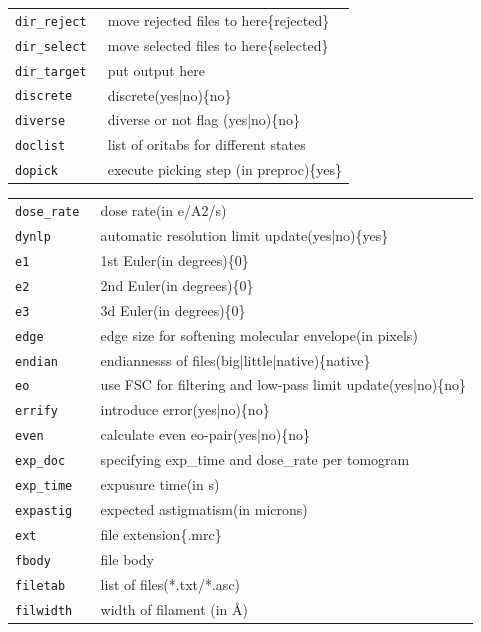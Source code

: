 \documentclass[a4paper,11pt]{article}
\begin{document}
\begin{tabular}{ll}
\texttt{dir\_reject      }&{ move rejected files to here\{rejected\}}\\
\texttt{dir\_select      }&{ move selected files to here\{selected\}}\\
\texttt{dir\_target      }&{ put output here}\\
\texttt{discrete        }&{ discrete(yes|no)\{no\}}\\
\texttt{diverse         }&{ diverse or not flag (yes|no)\{no\}}\\
\texttt{doclist         }&{ list of oritabs for different states}\\
\texttt{dopick          }&{ execute picking step (in preproc)\{yes\}}\\
\end{tabular}

\begin{tabular}{ll}
\texttt{dose\_rate       }&{ dose rate(in e/A2/s)}\\
\texttt{dynlp           }&{ automatic resolution limit update(yes|no)\{yes\}}\\
\texttt{e1              }&{ 1st Euler(in degrees)\{0\}}\\
\texttt{e2              }&{ 2nd Euler(in degrees)\{0\}}\\
\texttt{e3              }&{ 3d Euler(in degrees)\{0\}}\\
\texttt{edge            }&{ edge size for softening molecular envelope(in pixels)}\\
\texttt{endian          }&{ endiannesss of files(big|little|native)\{native\}}\\
\texttt{eo              }&{ use FSC for filtering and low-pass limit update(yes|no)\{no\}}\\
\texttt{errify          }&{ introduce error(yes|no)\{no\}}\\
\texttt{even            }&{ calculate even eo-pair(yes|no)\{no\}}\\
\texttt{exp\_doc         }&{ specifying exp\_time and dose\_rate per tomogram}\\
\texttt{exp\_time        }&{ expusure time(in s)}\\
\texttt{expastig        }&{ expected astigmatism(in microns)}\\
\texttt{ext             }&{ file extension\{.mrc\}}\\
\texttt{fbody           }&{ file body}\\
\texttt{filetab         }&{ list of files(*.txt/*.asc)}\\
\texttt{filwidth        }&{ width of filament (in \AA{})}\\

\end{tabular}
\end{document}
